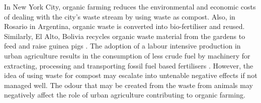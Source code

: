 In New York City, organic farming reduces the environmental and economic costs of dealing with the city's waste stream by using waste as compost. Also, in Rosario in Argentina, organic waste is converted into bio-fertiliser and reused. Similarly, El Alto, Bolivia recycles organic waste material from the gardens to feed and raise guinea pigs \cite{Hoornweg2012}. The adoption of a labour intensive production in urban agriculture results in the consumption of less crude fuel by machinery for extracting, processing and transporting fossil fuel based fertilisers \cite{Cruse2010}. However, the idea of using waste for compost may escalate into untenable negative effects if not managed well. The odour that may be created from the waste from animals \cite{Hallett2016} may negatively affect the role of urban agriculture contributing to organic farming.


